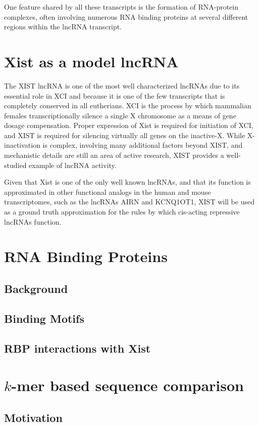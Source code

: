 One feature shared by all these transcripts is the formation of RNA-protein complexes, often involving numerous RNA binding proteins at several different regions within the lncRNA transcript. 

\section{Xist as a model lncRNA}
The XIST lncRNA is one of the most well characterized lncRNAs due to its essential role in XCI and because it is one of the few transcripts that is completely conserved in all eutherians. XCI is the process by which mammalian females transcriptionally silence a single X chromosome as a means of gene dosage compensation. Proper expression of Xist is required for initiation of XCI, and XIST is required for silencing virtually all genes on the inactive-X. While X-inactivation is complex, involving many additional factors beyond XIST, and mechanistic details are still an area of active research, XIST provides a well-studied example of lncRNA activity.

Given that Xist is one of the only well known lncRNAs, and that its function is approximated in other functional analogs in the human and mouse transcriptomes, such as the lncRNAs AIRN and KCNQ1OT1, XIST will be used as a ground truth approximation for the rules by which cis-acting repressive lncRNAs function.

\section{RNA Binding Proteins}
\lipsum[1-2]
\subsection{Background}
\lipsum[1-2]
\subsection{Binding Motifs}
\lipsum[1-2]
\subsection{RBP interactions with Xist}
\lipsum[1-2]

\section{$k$-mer based sequence comparison}
\lipsum[1-2]
\subsection{Motivation}
\lipsum[1-2]
